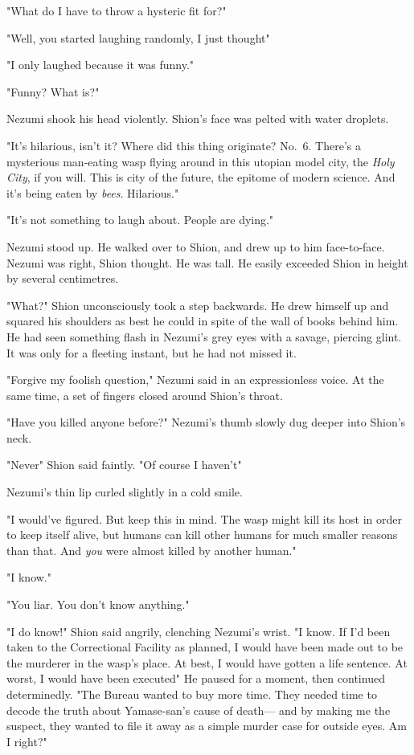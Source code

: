 "What do I have to throw a hysteric fit for?"

"Well, you started laughing randomly, I just thought\el "

"I only laughed because it was funny."

"Funny? What is?"

Nezumi shook his head violently. Shion's face was pelted with water
droplets.

"It's hilarious, isn't it? Where did this thing originate? No.~6.
There's a mysterious man-eating wasp flying around in this utopian model
city, the \emph{Holy City}, if you will. This is city of the future, the
epitome of modern science. And it's being eaten by \emph{bees}. Hilarious."

"It's not something to laugh about. People are dying."

Nezumi stood up. He walked over to Shion, and drew up to him
face-to-face. Nezumi was right, Shion thought. He was tall. He easily
exceeded Shion in height by several centimetres.

"What?" Shion unconsciously took a step backwards. He drew himself up
and squared his shoulders as best he could in spite of the wall of books
behind him. He had seen something flash in Nezumi's grey eyes with a
savage, piercing glint. It was only for a fleeting instant, but he had
not missed it.

"Forgive my foolish question," Nezumi said in an expressionless voice.
At the same time, a set of fingers closed around Shion's throat.

"Have you killed anyone before?" Nezumi's thumb slowly dug deeper into
Shion's neck.

"Never\el " Shion said faintly. "Of course I haven't\el "

Nezumi's thin lip curled slightly in a cold smile.

"I would've figured. But keep this in mind. The wasp might kill its host
in order to keep itself alive, but humans can kill other humans for much
smaller reasons than that. And \emph{you} were almost killed by another human."

"I know."

"You liar. You don't know anything."

"I do know!" Shion said angrily, clenching Nezumi's wrist. "I know. If
I'd been taken to the Correctional Facility as planned, I would have
been made out to be the murderer in the wasp's place. At best, I would
have gotten a life sentence. At worst, I would have been executed\el " He
paused for a moment, then continued determinedly. "The Bureau wanted to
buy more time. They needed time to decode the truth about Yamase-san's
cause of death--- and by making me the suspect, they wanted to file it
away as a simple murder case for outside eyes. Am I right?"

